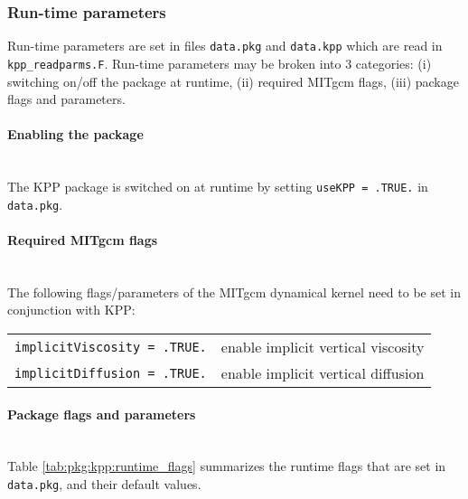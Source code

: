 
\subsubsection{Run-time parameters
\label{sec:pkg:kpp:runtime}}

Run-time parameters are set in files 
\texttt{data.pkg} and \texttt{data.kpp}
which are read in \texttt{kpp\_readparms.F}.
Run-time parameters may be broken into 3 categories:
(i) switching on/off the package at runtime,
(ii) required MITgcm flags,
(iii) package flags and parameters.

\paragraph{Enabling the package}
~ \\
%
The KPP package is switched on at runtime by setting
\texttt{useKPP = .TRUE.} in \texttt{data.pkg}.

\paragraph{Required MITgcm flags}
~ \\
%
The following flags/parameters of the MITgcm dynamical
kernel need to be set in conjunction with KPP:

\begin{tabular}{ll}
\texttt{implicitViscosity = .TRUE.} & enable implicit vertical viscosity \\
\texttt{implicitDiffusion = .TRUE.} & enable implicit vertical diffusion \\
\end{tabular}


\paragraph{Package flags and parameters}
~ \\
%
Table \ref{tab:pkg:kpp:runtime_flags} summarizes the
runtime flags that are set in \texttt{data.pkg}, and
their default values.


